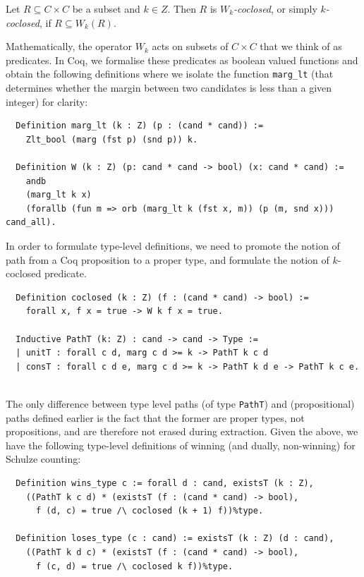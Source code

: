 \begin{definition} Let $R \subseteq C \times C$ be a subset and $k \in
Z$. Then $R$ is \emph{$W_k$-coclosed}, or simply
\emph{$k$-coclosed}, if $R \subseteq W_k(R)$.
\end{definition}

\noindent
Mathematically, the operator $W_k$ acts on subsets of $C \times C$
that we think of as predicates. In Coq, we formalise these
predicates as boolean valued functions and obtain the following
definitions where we isolate the function \texttt{marg\_lt} (that
determines whether the margin between two candidates is less than a
given integer) for clarity:

\begin{verbatim}
  Definition marg_lt (k : Z) (p : (cand * cand)) :=
    Zlt_bool (marg (fst p) (snd p)) k.

  Definition W (k : Z) (p: cand * cand -> bool) (x: cand * cand) :=
    andb 
    (marg_lt k x)
    (forallb (fun m => orb (marg_lt k (fst x, m)) (p (m, snd x))) cand_all).
\end{verbatim}

\noindent
In order to formulate type-level definitions, we need to promote the
notion of path from a Coq proposition to a proper type, and
formulate the notion of $k$-coclosed predicate.

\begin{verbatim} 
  Definition coclosed (k : Z) (f : (cand * cand) -> bool) :=
    forall x, f x = true -> W k f x = true.

  Inductive PathT (k: Z) : cand -> cand -> Type :=
  | unitT : forall c d, marg c d >= k -> PathT k c d
  | consT : forall c d e, marg c d >= k -> PathT k d e -> PathT k c e.
 
\end{verbatim}

\noindent
The only difference between type level paths (of type
\texttt{PathT}) and (propositional) paths defined earlier is the
fact that the former are proper types, not propositions, and are
therefore not erased during extraction. 
Given the above, we have the
following type-level definitions of winning (and dually,
non-winning) for Schulze counting:

\begin{verbatim}
  Definition wins_type c := forall d : cand, existsT (k : Z),
    ((PathT k c d) * (existsT (f : (cand * cand) -> bool),
      f (d, c) = true /\ coclosed (k + 1) f))%type.

  Definition loses_type (c : cand) := existsT (k : Z) (d : cand),
    ((PathT k d c) * (existsT (f : (cand * cand) -> bool),
      f (c, d) = true /\ coclosed k f))%type.
\end{verbatim}

